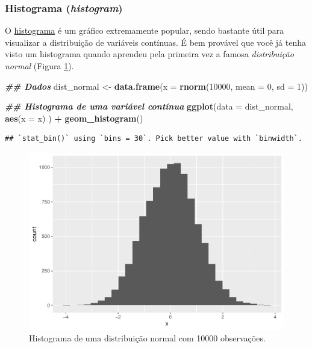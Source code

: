 \documentclass[
]{article}
\newenvironment{Shaded}{\begin{snugshade}}{\end{snugshade}}
\newcommand{\AttributeTok}[1]{\textcolor[rgb]{0.13,0.29,0.53}{#1}}
\newcommand{\DecValTok}[1]{\textcolor[rgb]{0.00,0.00,0.81}{#1}}
\newcommand{\DocumentationTok}[1]{\textcolor[rgb]{0.56,0.35,0.01}{\textbf{\textit{#1}}}}
\newcommand{\FunctionTok}[1]{\textcolor[rgb]{0.13,0.29,0.53}{\textbf{#1}}}
\newcommand{\NormalTok}[1]{#1}
\newcommand{\OtherTok}[1]{\textcolor[rgb]{0.56,0.35,0.01}{#1}}
\newcommand{\SpecialCharTok}[1]{\textcolor[rgb]{0.81,0.36,0.00}{\textbf{#1}}}
\begin{document}
\hypertarget{histograma-histogram}{%
\subsubsection{\texorpdfstring{Histograma (\emph{histogram})}{Histograma (histogram)}}\label{histograma-histogram}}

O \href{https://www.data-to-viz.com/graph/histogram.html}{histograma} é um gráfico extremamente popular, sendo bastante útil para visualizar a distribuição de variáveis contínuas. É bem provável que você já tenha visto um histograma quando aprendeu pela primeira vez a famosa \emph{distribuição normal} (Figura \ref{fig:fig-hist-norm}).

\begin{Shaded}
\begin{Highlighting}[]
\DocumentationTok{\#\# Dados}
\NormalTok{dist\_normal }\OtherTok{\textless{}{-}} \FunctionTok{data.frame}\NormalTok{(}\AttributeTok{x =} \FunctionTok{rnorm}\NormalTok{(}\DecValTok{10000}\NormalTok{, }\AttributeTok{mean =} \DecValTok{0}\NormalTok{, }\AttributeTok{sd =} \DecValTok{1}\NormalTok{))}

\DocumentationTok{\#\# Histograma de uma variável contínua}
\FunctionTok{ggplot}\NormalTok{(}\AttributeTok{data =}\NormalTok{ dist\_normal, }
       \FunctionTok{aes}\NormalTok{(}\AttributeTok{x =}\NormalTok{ x)}
\NormalTok{       ) }\SpecialCharTok{+}
    \FunctionTok{geom\_histogram}\NormalTok{()}
\end{Highlighting}
\end{Shaded}

\begin{verbatim}
## `stat_bin()` using `bins = 30`. Pick better value with `binwidth`.
\end{verbatim}

\begin{figure}
\includegraphics[width=0.75\linewidth,height=0.75\textheight]{epr_files/figure-latex/fig-hist-norm-1} \caption{Histograma de uma distribuição normal com 10000 observações.}\label{fig:fig-hist-norm}
\end{figure}
\end{document}
